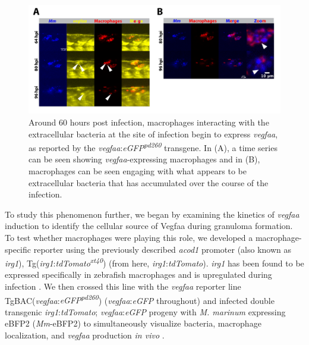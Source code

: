 \begin{figure}
\centering
\includegraphics[width=\textwidth]{images/extracellularvegfa.pdf}
\caption{Around 60 hours post infection, macrophages interacting with the extracellular bacteria at the site of infection begin to express \textit{vegfaa}, as reported by the \textit{vegfaa}:\textit{eGFP\textsuperscript{pd260}} transgene. In (A), a time series can be seen showing \textit{vegfaa}-expressing macrophages and in (B), macrophages can be seen engaging with what appears to be extracellular bacteria that has accumulated over the course of the infection.}
\label{figure:ecvegfa}

\end{figure}

To study this phenomenon further, we began by examining the kinetics of \textit{vegfaa} induction to identify the cellular source of Vegfaa during granuloma formation. To test whether macrophages were playing this role, we developed a macrophage-specific reporter using the previously described \textit{acod1} promoter (also known as \textit{irg1}), Tg(\textit{irg1}:\textit{tdTomato\textsuperscript{xt40}}) (from here, \textit{irg1}:\textit{tdTomato}). \textit{irg1} has been found to be expressed specifically in zebrafish macrophages and is upregulated during infection \citep{Sanderson2015, Kwon2022}. We then crossed this line with the \textit{vegfaa} reporter line TgBAC(\textit{vegfaa}:\textit{eGFP\textsuperscript{pd260}}) (\textit{vegfaa}:\textit{eGFP} throughout) \citep{Karra2018} and infected double transgenic \textit{irg1}:\textit{tdTomato}; \textit{vegfaa}:\textit{eGFP} progeny with \textit{M. marinum} expressing eBFP2 (\textit{Mm}-eBFP2) to simultaneously visualize bacteria, macrophage localization, and \textit{vegfaa} production \textit{in vivo} \citep{Takaki2013}.


